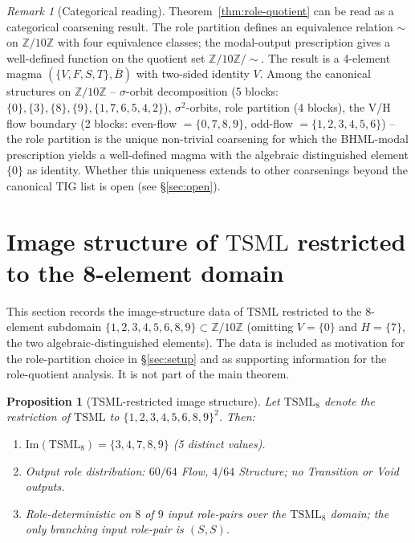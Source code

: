 \documentclass[11pt,reqno]{amsart}
\theoremstyle{plain}
\newtheorem{proposition}[theorem]{Proposition}
\theoremstyle{definition}
\theoremstyle{remark}
\newtheorem*{remark}{Remark}
\newcommand{\Z}{\mathbb{Z}}
\newcommand{\TS}{\mathrm{TSML}}
\newcommand{\Bbar}{\overline{B}}
\begin{document}
\begin{remark}[Categorical reading]
Theorem~\ref{thm:role-quotient} can be read as a categorical
coarsening result. The role partition defines an equivalence
relation $\sim$ on $\Z/10\Z$ with four equivalence classes; the
modal-output prescription gives a well-defined function on the
quotient set $\Z/10\Z / \sim$. The result is a 4-element magma
$(\{V, F, S, T\}, \Bbar)$ with two-sided identity $V$. Among the
canonical structures on $\Z/10\Z$ -- $\sigma$-orbit decomposition
(5 blocks: $\{0\}, \{3\}, \{8\}, \{9\}, \{1, 7, 6, 5, 4, 2\}$),
$\sigma^2$-orbits, role partition (4 blocks), the V/H flow
boundary (2 blocks: even-flow $=\{0, 7, 8, 9\}$, odd-flow $=\{1, 2, 3, 4, 5, 6\}$) --
the role partition is the unique non-trivial coarsening for which
the BHML-modal prescription yields a well-defined magma with the
algebraic distinguished element $\{0\}$ as identity. Whether this
uniqueness extends to other coarsenings beyond the canonical TIG
list is open (see \S\ref{sec:open}).
\end{remark}

\section{Image structure of $\TS$ restricted to the 8-element domain} \label{sec:image}

This section records the image-structure data of $\TS$ restricted to
the 8-element subdomain $\{1, 2, 3, 4, 5, 6, 8, 9\} \subset \Z/10\Z$
(omitting $V = \{0\}$ and $H = \{7\}$, the two algebraic-distinguished
elements). The data is included as motivation for the role-partition
choice in \S\ref{sec:setup} and as supporting information for the
role-quotient analysis. It is not part of the main theorem.

\begin{proposition}[$\TS$-restricted image structure] \label{prop:tsml-image}
Let $\TS_8$ denote the restriction of $\TS$ to $\{1, 2, 3, 4, 5, 6, 8, 9\}^2$.
Then:
\begin{enumerate}[label=(\roman*)]
\item $\mathrm{Im}(\TS_8) = \{3, 4, 7, 8, 9\}$ (5 distinct values).
\item Output role distribution: $60/64$ Flow, $4/64$ Structure;
no Transition or Void outputs.
\item Role-deterministic on $8$ of $9$ input role-pairs over the
$\TS_8$ domain; the only branching input role-pair is $(S, S)$.
\end{enumerate}
\end{proposition}
\end{document}

